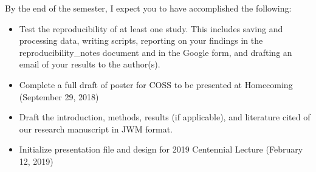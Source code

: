 \documentclass{tufte-handout}
\begin{document}
By the end of the semester, I expect you to have accomplished the following:

\begin{itemize}
	\item Test the reproducibility of at least one study. This includes saving and processing data, writing scripts, reporting on your findings in the reproducibility\_notes document and in the Google form, and drafting an email of your results to the author(s).
	\item Complete a full draft of poster for COSS to be presented at Homecoming (September 29, 2018)
	\item Draft the introduction, methods, results (if applicable), and literature cited of our research manuscript in JWM format. 
	\item Initialize presentation file and design for 2019 Centennial Lecture (February 12, 2019)
\end{itemize}
\end{document}
